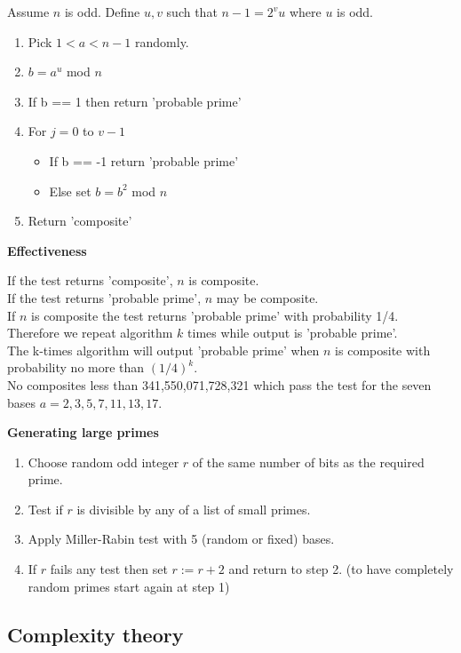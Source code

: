 \documentclass{article}
\begin{document}
Assume $n$ is odd. Define $u,v$ such that $n-1=2^v u$ where $u$ is odd.
\begin{enumerate}
    \item Pick $1 < a < n-1$ randomly.
    \item $b = a^u$ mod $n$
    \item If b == 1 then return 'probable prime'
    \item For $j = 0$ to $v-1$
    \begin{itemize}
        \item If b == -1 return 'probable prime'
        \item Else set $b=b^2$ mod $n$
    \end{itemize}
    \item Return 'composite'
\end{enumerate}

\textbf{Effectiveness}

If the test returns 'composite', $n$ is composite.\\
If the test returns 'probable prime', $n$ may be composite.\\
If $n$ is composite the test returns 'probable prime' with probability 1/4.\\
Therefore we repeat algorithm $k$ times while output is 'probable prime'.\\
The k-times algorithm will output 'probable prime' when $n$ is composite with probability no more than $(1/4)^k$.\\
No composites less than 341,550,071,728,321 which pass the test for the seven bases $a=2,3,5,7,11,13,17$.

\textbf{Generating large primes}\label{Generating large primes}

\begin{enumerate}
    \item Choose random odd integer $r$ of the same number of bits as the required prime.
    \item Test if $r$ is divisible by any of a list of small primes.
    \item Apply Miller-Rabin test with 5 (random or fixed) bases.
    \item If $r$ fails any test then set $r := r+2$ and return to step 2. (to have completely random primes start again at step 1)
\end{enumerate}

\subsection{Complexity theory}
\end{document}
